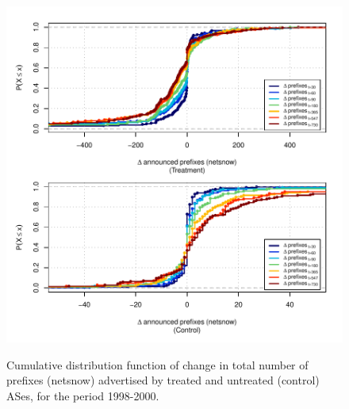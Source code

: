 \begin{figure}[H]
\begin{centering}
\begin{singlespace}
\captionsetup{list=no}
    \includegraphics[width=6in]{figures/behavior-netsnow-1998_2000-corr.pdf}
    \vspace{-2em}\\
    \caption{Cumulative distribution function of change in total number of
    prefixes (netsnow) advertised by treated and untreated (control) ASes, for
    the period 1998-2000.}
\end{singlespace}
\end{centering}
\end{figure}

